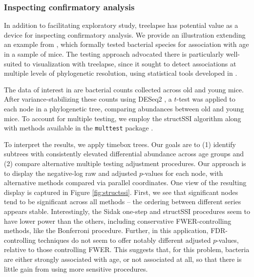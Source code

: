 \subsubsection{Inspecting confirmatory analysis}\label{structssi}

In addition to facilitating exploratory study, treelapse has potential
value as a device for inspecting confirmatory analysis. We provide an
illustration extending an example from \citep{callahan2016bioconductor}, which
formally tested bacterial species for association with age in a sample of mice.
The testing approach advocated there is particularly well-suited to
visualization with treelapse, since it sought to detect associations at multiple
levels of phylogenetic resolution, using statistical tools developed in
\citep{yekutieli2008hierarchical, sankaran2014structssi}.

The data of interest in \citep{callahan2016bioconductor} are bacterial counts
collected across old and young mice. After variance-stabilizing these counts
using DESeq2 \citep{love2014moderated}, a $t$-test was applied to each node in a
phylogenetic tree, comparing abundances between old and young mice. To account
for multiple testing, we employ the structSSI algorithm
\citep{yekutieli2008hierarchical, sankaran2014structssi} along with methods
available in the \texttt{multtest} package \citep{pollard2005multiple}.

To interpret the results, we apply timebox trees. Our goals are to (1) identify
subtrees with consistently elevated differential abundance across age groups and
(2) compare alternative multiple testing adjustment procedures. Our approach is
to display the negative-log raw and adjusted $p$-values for each node, with
alternative methods compared via parallel coordinates. One view of the resulting
display is captured in Figure \ref{fig:structssi}. First, we see that
significant nodes tend to be significant across all methods -- the ordering
between different series appears stable. Interestingly, the Sidak one-step and
structSSI procedures seem to have lower power than the others, including
conservative FWER-controlling methods, like the Bonferroni procedure. Further,
in this application, FDR-controlling techniques do not seem to offer notably
different adjusted $p$-values, relative to those controlling FWER. This suggests
that, for this problem, bacteria are either strongly associated with age, or not
associated at all, so that there is little gain from using more sensitive
procedures.

